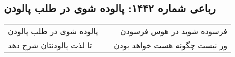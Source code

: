 \begin{center}
\section*{رباعی شماره ۱۴۴۲: پالوده شوی در طلب پالودن}
\label{sec:1442}
\begin{longtable}{l p{0.5cm} r}
پالوده شوی در طلب پالودن
&&
فرسوده شوید در هوس فرسودن
\\
تا لذت پالودنتان شرح دهد
&&
ور نیست چگونه هست خواهد بودن
\\
\end{longtable}
\end{center}

